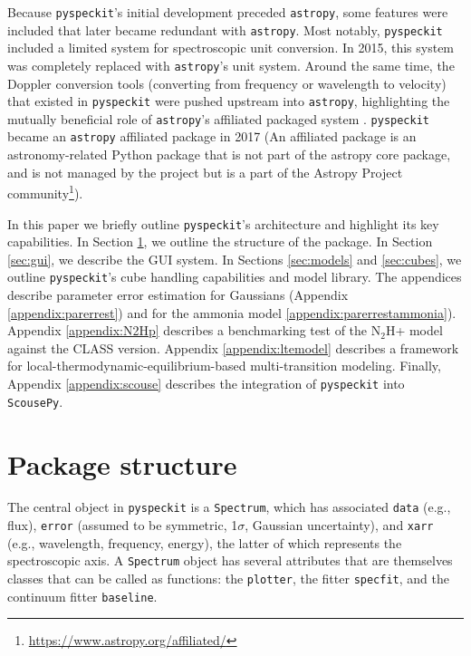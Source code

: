 \documentclass[twocolumn,linenumbers]{aastex63}
\newcommand{\pyspeckit}{\texttt{pyspeckit}\xspace}
\newcommand{\astropy}{\texttt{astropy}\xspace}
\begin{document}
Because \pyspeckit's initial development preceded \astropy, some features
were included that later became redundant with \astropy.  Most notably, \pyspeckit included
a limited system for spectroscopic unit conversion.  In 2015, this system
was completely replaced with \astropy's unit system.  Around the same time,
the Doppler conversion tools (converting from frequency or wavelength to
velocity) that existed in \pyspeckit were pushed upstream into \astropy,
highlighting the mutually beneficial role of \astropy's affiliated
packaged system \citep{AstropyCollaboration2018}.  \pyspeckit became
an \astropy affiliated package in 2017 (An affiliated package is an astronomy-related Python package that is not part of the astropy core package, and is not managed by the project but is a part of the Astropy Project community\footnote{\url{https://www.astropy.org/affiliated/}}).


In this paper we briefly outline \texttt{pyspeckit}'s architecture and highlight
its key capabilities. In Section \ref{sec:basicstructure}, we  outline the
structure of the package.  In Section \ref{sec:gui}, we describe the GUI
system.  In Sections \ref{sec:models} and \ref{sec:cubes}, we outline
\pyspeckit's cube handling capabilities and model library. 
The appendices describe parameter error estimation for Gaussians (Appendix \ref{appendix:parerrest}) and for the ammonia model \ref{appendix:parerrestammonia}).
Appendix \ref{appendix:N2Hp} describes a benchmarking test of the N$_2$H+ model against the CLASS version.
Appendix \ref{appendix:ltemodel} describes a framework for local-thermodynamic-equilibrium-based multi-transition modeling.
Finally, Appendix \ref{appendix:scouse} describes the integration of \texttt{pyspeckit} into \texttt{ScousePy}.



\section{Package structure}
\label{sec:basicstructure}
The central object in \pyspeckit is a \texttt{Spectrum}, which has
associated \texttt{data} (e.g., flux), \texttt{error} (assumed to be symmetric, 1$\sigma$, Gaussian uncertainty), and \texttt{xarr} (e.g., wavelength,
frequency, energy), the latter of
which represents the spectroscopic axis.  A \texttt{Spectrum} object has
several attributes that are themselves classes that can be called
as functions: the \texttt{plotter}, the fitter \texttt{specfit}, and the
continuum fitter \texttt{baseline}.
\end{document}
